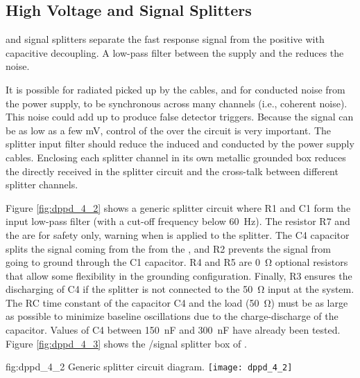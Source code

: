\subsection{High Voltage and Signal Splitters}
\label{sec:fddp-pd-4.2}

 and signal splitters 
separate the fast  response signal from the positive  with capacitive decoupling. 
A low-pass filter between the  supply and the  reduces the noise.

It is possible for radiated  picked up by the cables, and for conducted noise from the  power supply, to be synchronous across many  channels (i.e., coherent noise). This noise could add up to produce false detector triggers. Because the  signal can be as low as a few \si{mV},
control of the  over the circuit is very important. The splitter  input filter should reduce the  induced and conducted by the power supply cables. Enclosing each splitter channel in its own metallic grounded box reduces the  directly received in the splitter circuit and 
the cross-talk between different splitter channels.

Figure \ref{fig:dppd_4_2} shows a generic splitter circuit where R1 and C1 form the  input low-pass filter (with a cut-off frequency below \SI{60}{Hz}). The resistor R7 and the   are for safety only, warning when  is applied to the splitter. The C4 capacitor splits the signal coming from the  from the , and R2 prevents the  signal from going to ground through the C1 capacitor. R4 and R5 are \SI{0}{\ohm} optional resistors that allow some flexibility in the grounding configuration. Finally, R3 ensures the discharging of C4 if the splitter is not connected to the \SI{50}{\ohm} input at the  system. The RC time constant of the capacitor C4 and the load (\SI{50}{\ohm}) must be as large as possible to minimize baseline oscillations due to the charge-discharge of the capacitor. Values of C4 between \SI{150}{nF} and \SI{300}{nF} have already been tested. Figure \ref{fig:dppd_4_3} shows the /signal splitter box of .

\begin{dunefigure}{fig:dppd_4_2}
{Generic splitter circuit diagram.}
\texttt{[image: dppd\_4\_2]}
\end{dunefigure}

